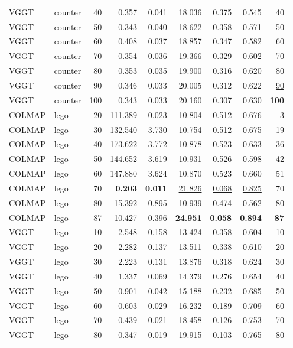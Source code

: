 \begin{table}[H]
\begin{tabular}{llrrrrrrr}
VGGT & counter & 40 & 0.357 & 0.041 & 18.036 & 0.375 & 0.545 & 40 \\
VGGT & counter & 50 & 0.343 & 0.040 & 18.622 & 0.358 & 0.571 & 50 \\
VGGT & counter & 60 & 0.408 & 0.037 & 18.857 & 0.347 & 0.582 & 60 \\
VGGT & counter & 70 & 0.354 & 0.036 & 19.366 & 0.329 & 0.602 & 70 \\
VGGT & counter & 80 & 0.353 & 0.035 & 19.900 & 0.316 & 0.620 & 80 \\
VGGT & counter & 90 & 0.346 & 0.033 & 20.005 & 0.312 & 0.622 & \underline{90} \\
VGGT & counter & 100 & 0.343 & 0.033 & 20.160 & 0.307 & 0.630 & \textbf{100} \\
\midrule
COLMAP & lego & 20 & 111.389 & 0.023 & 10.804 & 0.512 & 0.676 & 3 \\
COLMAP & lego & 30 & 132.540 & 3.730 & 10.754 & 0.512 & 0.675 & 19 \\
COLMAP & lego & 40 & 173.622 & 3.772 & 10.878 & 0.523 & 0.633 & 36 \\
COLMAP & lego & 50 & 144.652 & 3.619 & 10.931 & 0.526 & 0.598 & 42 \\
COLMAP & lego & 60 & 147.880 & 3.624 & 10.870 & 0.523 & 0.660 & 51 \\
COLMAP & lego & 70 & \textbf{0.203} & \textbf{0.011} & \underline{21.826} & \underline{0.068} & \underline{0.825} & 70 \\
COLMAP & lego & 80 & 15.392 & 0.895 & 10.939 & 0.474 & 0.562 & \underline{80} \\
COLMAP & lego & 87 & 10.427 & 0.396 & \textbf{24.951} & \textbf{0.058} & \textbf{0.894} & \textbf{87} \\
VGGT & lego & 10 & 2.548 & 0.158 & 13.424 & 0.358 & 0.604 & 10 \\
VGGT & lego & 20 & 2.282 & 0.137 & 13.511 & 0.338 & 0.610 & 20 \\
VGGT & lego & 30 & 2.223 & 0.131 & 13.876 & 0.318 & 0.624 & 30 \\
VGGT & lego & 40 & 1.337 & 0.069 & 14.379 & 0.276 & 0.654 & 40 \\
VGGT & lego & 50 & 0.901 & 0.042 & 15.188 & 0.232 & 0.685 & 50 \\
VGGT & lego & 60 & 0.603 & 0.029 & 16.232 & 0.189 & 0.709 & 60 \\
VGGT & lego & 70 & 0.439 & 0.021 & 18.458 & 0.126 & 0.753 & 70 \\
VGGT & lego & 80 & 0.347 & \underline{0.019} & 19.915 & 0.103 & 0.765 & \underline{80} \\

\end{tabular}
\end{table}
